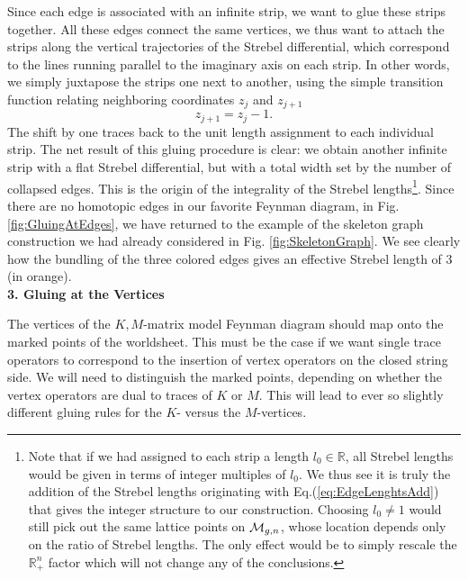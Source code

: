 \documentclass[english]{article}
\renewcommand{\>}{\rangle}
\newcommand{\<}{\langle}
\renewcommand{\(}{\left(}
\renewcommand{\)}{\right)}
\begin{document}
Since each edge is associated with an infinite strip, we want to glue these strips together. All these edges connect the same vertices, we thus want to attach the strips along the vertical trajectories of the Strebel differential, which correspond to the lines running parallel to the imaginary axis on each strip. In other words, we simply juxtapose the strips one next to another, using the simple transition function relating neighboring coordinates $z_j$ and $z_{j+1}$
\begin{equation}
    z_{j+1}=z_{j}-1 . \label{eq:EdgeLenghtsAdd}
\end{equation}
The shift by one traces back to the unit length assignment to each individual strip. The net result of this gluing procedure is clear: we obtain another infinite strip with a flat Strebel differential, but with a total width set by the number of collapsed edges. This is the origin of the integrality of the Strebel lengths\footnote{Note that if we had assigned to each strip a length $l_{0}\in \mathbb{R}$, all Strebel lengths would be given in terms of integer multiples of $l_{0}$. We thus see it is truly the addition of the Strebel lengths originating with Eq.(\ref{eq:EdgeLenghtsAdd}) that gives the integer structure to our construction. Choosing $l_{0} \neq 1$ would still pick out the same lattice points on ${\cal M}_{g,n}$, whose location depends only on the ratio of Strebel lengths. The only effect would be to simply rescale the ${\mathbb R}_+^n$ factor which will not change any of the conclusions.}. 
Since there are no homotopic edges in our favorite Feynman diagram, in Fig. \ref{fig:GluingAtEdges}, we have returned to the example of the skeleton graph construction we had already considered in  Fig. \ref{fig:SkeletonGraph}. We see clearly how the bundling of the three colored edges gives an effective Strebel length of $3$ (in orange). \\


\noindent\textbf{3. Gluing at the Vertices}

The vertices of the $K, M$-matrix model Feynman diagram should map onto the marked points of the worldsheet. This must be the case if we want single trace operators to correspond to the insertion of vertex operators on the closed string side. We will need to distinguish the marked points, depending on whether the vertex operators are dual to traces of $K$ or $M$. This will lead to ever so slightly different gluing rules for the $K$- versus the $M$-vertices.  
\end{document}
